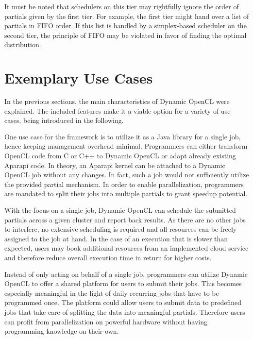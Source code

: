 It must be noted that schedulers on this tier may rightfully ignore the order of partials given by the first tier. For example, the first tier might hand over a list of partials in FIFO order. If this list is handled by a simplex-based scheduler on the second tier, the principle of FIFO may be violated in favor of finding the optimal distribution.

\section{Exemplary Use Cases}
\label{use_cases}
In the previous sections, the main characteristics of Dynamic OpenCL were explained. The included features make it a viable option for a variety of use cases, being introduced in the following.

\begin{description}[style=nextline]
	\item[Job Based Library]
	One use case for the framework is to utilize it as a Java library for a single job, hence keeping management overhead minimal. Programmers can either transform OpenCL code from C or C++ to Dynamic OpenCL or adapt already existing Aparapi code. In theory, an Aparapi kernel can be attached to a Dynamic OpenCL job without any changes. In fact, such a job would not sufficiently utilize the provided partial mechanism. In order to enable parallelization, programmers are mandated to split their jobs into multiple partials to grant speedup potential.

	With the focus on a single job, Dynamic OpenCL can schedule the submitted partials across a given cluster and report back results. As there are no other jobs to interfere, no extensive scheduling is required and all resources can be freely assigned to the job at hand. In the case of an execution that is slower than expected, users may book additional resources from an implemented cloud service and therefore reduce overall execution time in return for higher costs.

	\item[Local Cluster Provider]

	Instead of only acting on behalf of a single job, programmers can utilize Dynamic OpenCL to offer a shared platform for users to submit their jobs. This becomes especially meaningful in the light of daily recurring jobs that have to be programmed once. The platform could allow users to submit data to predefined jobs that take care of splitting the data into meaningful partials. Therefore users can profit from parallelization on powerful hardware without having programming knowledge on their own.


\end{description}
